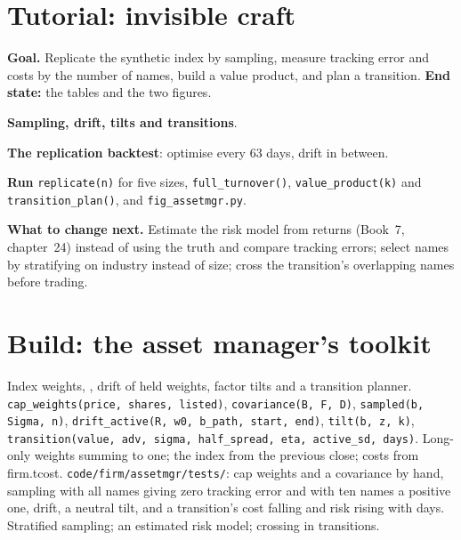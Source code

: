 \section{Tutorial: invisible craft}\label{tut:s1:the-asset-managers-strategies:tut}

\begin{tutorial}
\textbf{Goal.} Replicate the synthetic index by sampling, measure tracking error and costs by the number of names, build a value product, and plan a
transition. \textbf{End state:} the tables and the two figures.
\begin{tutsteps}
\item \textbf{Sampling, drift, tilts and transitions}.
\label{lst:s1:the-asset-managers-strategies:sampled}
\item \textbf{The replication backtest}: optimise every 63 days, drift in between.
\label{lst:s1:the-asset-managers-strategies:replicate}
\item \textbf{Run} \texttt{replicate(n)} for five sizes, \texttt{full\_turnover()}, \texttt{value\_product(k)} and \texttt{transition\_plan()}, and
\texttt{fig\_assetmgr.py}.
\end{tutsteps}
\textbf{What to change next.} Estimate the risk model from returns (Book~7, chapter~24) instead of using the truth and compare tracking errors; select
names by stratifying on industry instead of size; cross the transition's overlapping names before trading.
\end{tutorial}

\section{Build: the asset manager's toolkit}\label{bld:s1:the-asset-managers-strategies:assetmgr}

\begin{build}
 Index weights, , drift of held weights, factor tilts and a transition planner.
 \texttt{cap\_weights(price, shares, listed)}, \texttt{covariance(B, F, D)}, \texttt{sampled(b, Sigma, n)}, \texttt{drift\_active(R, w0,
b\_path, start, end)}, \texttt{tilt(b, z, k)}, \texttt{transition(value, adv, sigma, half\_spread, eta, active\_sd, days)}.
 Long-only weights summing to one; the index from the previous close; costs from firm.tcost.
 \texttt{code/firm/assetmgr/tests/}: cap weights and a covariance by hand, sampling with all names giving zero tracking error and
with ten names a positive one, drift, a neutral tilt, and a transition's cost falling and risk rising with days.
 Stratified sampling; an estimated risk model; crossing in transitions.
\end{build}

